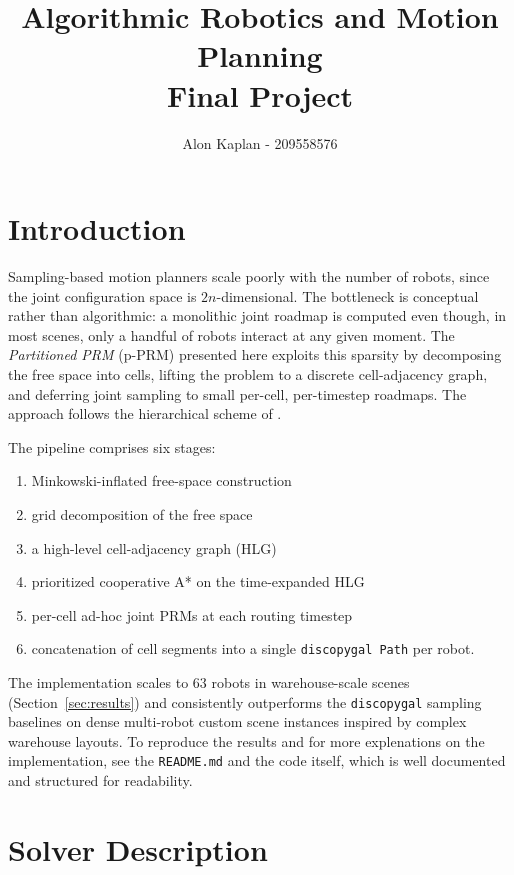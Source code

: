 \documentclass[12pt,a4paper]{article}
\begin{document}
    \title{Algorithmic Robotics and Motion Planning\\
    Final Project}
    \author{Alon Kaplan - 209558576}
    \maketitle


    \section{Introduction}
    Sampling-based motion planners scale poorly with the number of robots, since the joint configuration space is $2n$-dimensional. The bottleneck is conceptual rather than algorithmic: a monolithic joint roadmap is computed even though, in most scenes, only a handful of robots interact at any given moment. The \emph{Partitioned PRM} (p-PRM) presented here exploits this sparsity by decomposing the free space into cells, lifting the problem to a discrete cell-adjacency graph, and deferring joint sampling to small per-cell, per-timestep roadmaps. The approach follows the hierarchical scheme of \citet{pan2024hierarchicallargescalemultirobot}.

    The pipeline comprises six stages:
    \begin{enumerate}
        \item Minkowski-inflated free-space construction
        \item grid decomposition of the free space
        \item a high-level cell-adjacency graph (HLG)
        \item prioritized cooperative A* on the time-expanded HLG
        \item per-cell ad-hoc joint PRMs at each routing timestep
        \item concatenation of cell segments into a single \texttt{discopygal Path} per robot.
    \end{enumerate}
    The implementation scales to $63$ robots in warehouse-scale scenes (Section~\ref{sec:results}) and consistently outperforms the \texttt{discopygal} sampling baselines on dense multi-robot custom scene instances inspired by complex warehouse layouts.
    To reproduce the results and for more explenations on the implementation, see the \texttt{README.md} and the code itself, which is well documented and structured for readability.

    \section{Solver Description}
    \label{sec:solver}
\end{document}
